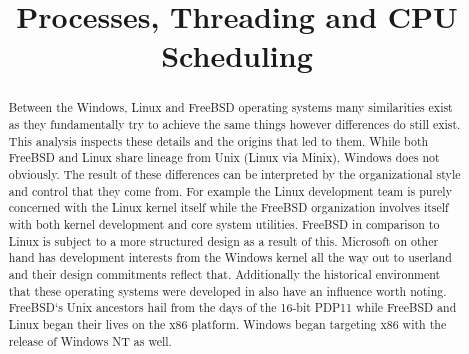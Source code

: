 \documentclass[letterpaper,10pt,draftclsnofoot,onecolumn]{IEEEtran}
\begin{document}
\title{Processes, Threading and CPU Scheduling}

\author{
}

\maketitle
\begin{abstract}
Between the Windows, Linux and FreeBSD operating systems many similarities exist as they fundamentally try to achieve the same things however differences do still exist. This analysis inspects these details and the origins that led to them. While both FreeBSD and Linux share lineage from Unix (Linux via Minix), Windows does not obviously. The result of these differences can be interpreted by the organizational style and control that they come from. For example the Linux development team is purely concerned with the Linux kernel itself while the FreeBSD organization involves itself with both kernel development and core system utilities. FreeBSD in comparison to Linux is subject to a more structured design as a result of this. Microsoft on other hand has development interests from the Windows kernel all the way out to userland and their design commitments reflect that. Additionally the historical environment that these operating systems were developed in also have an influence worth noting. FreeBSD`s Unix ancestors hail from the days of the 16-bit PDP11 while FreeBSD and Linux began their lives on the x86 platform. Windows began targeting x86 with the release of Windows NT as well.
\end{abstract}
\pagebreak

\tableofcontents
\pagebreak
\end{document}
